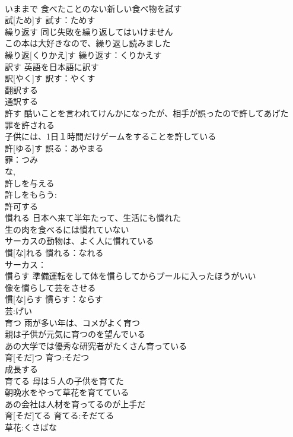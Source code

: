 \documentclass[8pt]{extreport}
\begin{document}
\begin{CJK}{UTF8}{min}
\\	いままで 食べたことのない新しい食べ物を試す 
\\	試[ため]す			試す：ためす
\\	繰り返す	同じ失敗を繰り返してはいけません 
\\	この本は大好きなので、繰り返し読みました 
\\	繰り返[くりかえ]す			繰り返す：くりかえす
\\	訳す	英語を日本語に訳す 
\\	訳[やく]す			訳す：やくす
\\	翻訳する 
\\	通訳する 
\\	許す	酷いことを言われてけんかになったが、相手が誤ったので許してあげた 
\\	罪を許される 
\\	子供には、1日１時間だけゲームをすることを許している 
\\	許[ゆる]す			誤る：あやまる
\\	罪：つみ
\\	な, 
\\	許しを与える 
\\	許しをもらう: 
\\	許可する 
\\	慣れる	日本へ来て半年たって、生活にも慣れた 
\\	生の肉を食べるには慣れていない 
\\	サーカスの動物は、よく人に慣れている 
\\	慣[な]れる			慣れる：なれる
\\	サーカス：
\\	慣らす	準備運転をして体を慣らしてからプールに入ったほうがいい 
\\	像を慣らして芸をさせる 
\\	慣[な]らす			慣らす：ならす
\\	芸:げい
\\	育つ	雨が多い年は、コメがよく育つ 
\\	親は子供が元気に育つのを望んでいる 
\\	あの大学では優秀な研究者がたくさん育っている 
\\	育[そだ]つ			育つ:そだつ
\\	成長する 
\\	育てる	母は５人の子供を育てた 
\\	朝晩水をやって草花を育てている 
\\	あの会社は人材を育ってるのが上手だ 
\\	育[そだ]てる			育てる:そだてる
\\	草花:くさばな

\end{CJK}
\end{document}
